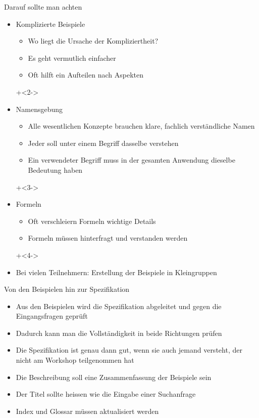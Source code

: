 \begin{frame}{Darauf sollte man achten}

\begin{itemize}
	\item Komplizierte Beispiele
	\begin{itemize}
		\item Wo liegt die Ursache der Kompliziertheit?
		\item Es geht vermutlich einfacher
		\item Oft hilft ein Aufteilen nach Aspekten
	\end{itemize}
	
\onslide+<2->
	
	\item Namensgebung
	\begin{itemize}
		\item Alle wesentlichen Konzepte brauchen klare, fachlich verständliche Namen
		\item Jeder soll unter einem Begriff dasselbe verstehen
		\item Ein verwendeter Begriff muss in der gesamten Anwendung dieselbe Bedeutung haben
	\end{itemize}
	
\onslide+<3->
	
	\item Formeln
	\begin{itemize}
		\item Oft verschleiern Formeln wichtige Details
		\item Formeln müssen hinterfragt und verstanden werden
	\end{itemize}
	
\onslide+<4->
	
	\item Bei vielen Teilnehmern: Erstellung der Beispiele in Kleingruppen
\end{itemize}

\end{frame}



\begin{frame}{Von den Beispielen hin zur Spezifikation}

\begin{itemize}
	\item Aus den Beispielen wird die Spezifikation abgeleitet und gegen die Eingangsfragen geprüft
	\item Dadurch kann man die Vollständigkeit in beide Richtungen prüfen
	\item Die Spezifikation ist genau dann gut, wenn sie auch jemand versteht, der nicht am Workshop teilgenommen hat
	\item Die Beschreibung soll eine Zusammenfassung der Beispiele sein
	\item Der Titel sollte heissen wie die Eingabe einer Suchanfrage
	\item Index und Glossar müssen aktualisiert werden
\end{itemize}

\end{frame}
 
